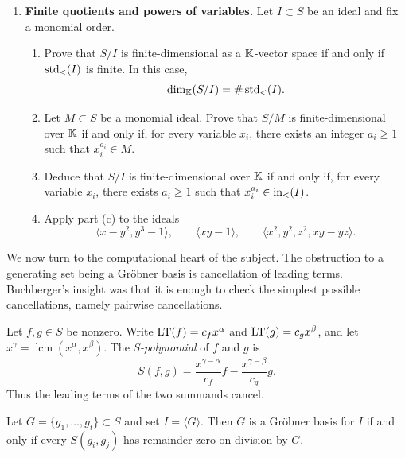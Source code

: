 \documentclass[Notebook.tex]{subfiles}
\begin{document}
\begin{enumerate}[leftmargin=*, resume=problems]
\begin{enumerate}[label=(\alph*),ref=\theenumi\alph*]
    \item With $I$ as in part (d), compute the normal forms of $x^5$, $x^2y+y^7$, and $xy^2+x+y$.
\end{enumerate}

\item \textbf{Finite quotients and powers of variables.} Let $I\subset S$ be an ideal and fix a monomial order.
\begin{enumerate}[label=(\alph*),ref=\theenumi\alph*]
    \item Prove that $S/I$ is finite-dimensional as a $\mathbb K$-vector space if and only if $\operatorname{\text{std}}_<(I)$ is finite. In this case,
    \[
    \dim_{\mathbb K}(S/I)=\#\operatorname{\text{std}}_<(I).
    \]
    
    \item Let $M\subset S$ be a monomial ideal. Prove that $S/M$ is finite-dimensional over $\mathbb K$ if and only if, for every variable $x_i$, there exists an integer $a_i\geq1$ such that $x_i^{a_i}\in M$.
    
    \item Deduce that $S/I$ is finite-dimensional over $\mathbb K$ if and only if, for every variable $x_i$, there exists $a_i\geq1$ such that $x_i^{a_i}\in \text{in}_<(I)$.
    
    \item Apply part (c) to the ideals
    \[
    \langle x-y^2,y^3-1\rangle,\qquad \langle xy-1\rangle,\qquad \langle x^2,y^2,z^2,xy-yz\rangle.
    \]
\end{enumerate}
\end{enumerate}

\hrulefill

We now turn to the computational heart of the subject. The obstruction to a generating set being a Gr\"obner basis is cancellation of leading terms. Buchberger's insight was that it is enough to check the simplest possible cancellations, namely pairwise cancellations.

\begin{definition}
Let $f,g\in S$ be nonzero. Write $\text{LT}(f)=c_fx^{\alpha}$ and $\text{LT}(g)=c_gx^{\beta}$, and let $x^{\gamma}=\operatorname{lcm}(x^{\alpha},x^{\beta})$. The \emph{$S$-polynomial} of $f$ and $g$ is
\[
    S(f,g)=\frac{x^{\gamma-\alpha}}{c_f}f-\frac{x^{\gamma-\beta}}{c_g}g.
\]
Thus the leading terms of the two summands cancel.
\end{definition}

\begin{theorem}\label{thm:buchberger}
Let $G=\{g_1,\ldots,g_t\}\subset S$ and set $I=\langle G\rangle$. Then $G$ is a Gr\"obner basis for $I$ if and only if every $S(g_i,g_j)$ has remainder zero on division by $G$.
\end{theorem}
\end{document}
